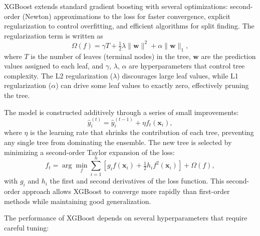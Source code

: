XGBoost extends standard gradient boosting with several optimizations: second-order (Newton) approximations to the loss for faster convergence, explicit regularization to control overfitting, and efficient algorithms for split finding. The regularization term is written as
\begin{equation}
\Omega(f) = \gamma T + \tfrac{1}{2}\lambda \|\mathbf{w}\|^2 + \alpha \|\mathbf{w}\|_1,
\end{equation}
where $T$ is the number of leaves (terminal nodes) in the tree, $\mathbf{w}$ are the prediction values assigned to each leaf, and $\gamma$, $\lambda$, $\alpha$ are hyperparameters that control tree complexity. The L2 regularization ($\lambda$) discourages large leaf values, while L1 regularization ($\alpha$) can drive some leaf values to exactly zero, effectively pruning the tree.

The model is constructed additively through a series of small improvements:
\begin{equation}
\hat{y}_i^{(t)} = \hat{y}_i^{(t-1)} + \eta f_t(\mathbf{x}_i),
\end{equation}
where $\eta$ is the learning rate that shrinks the contribution of each tree, preventing any single tree from dominating the ensemble. The new tree is selected by minimizing a second-order Taylor expansion of the loss:
\begin{equation}
f_t = \arg\min_{f} \sum_{i=1}^{n} \left[g_i f(\mathbf{x}_i) + \tfrac{1}{2} h_i f^2(\mathbf{x}_i)\right] + \Omega(f),
\end{equation}
with $g_i$ and $h_i$ the first and second derivatives of the loss function. This second-order approach allows XGBoost to converge more rapidly than first-order methods while maintaining good generalization.

The performance of XGBoost depends on several hyperparameters that require careful tuning:

